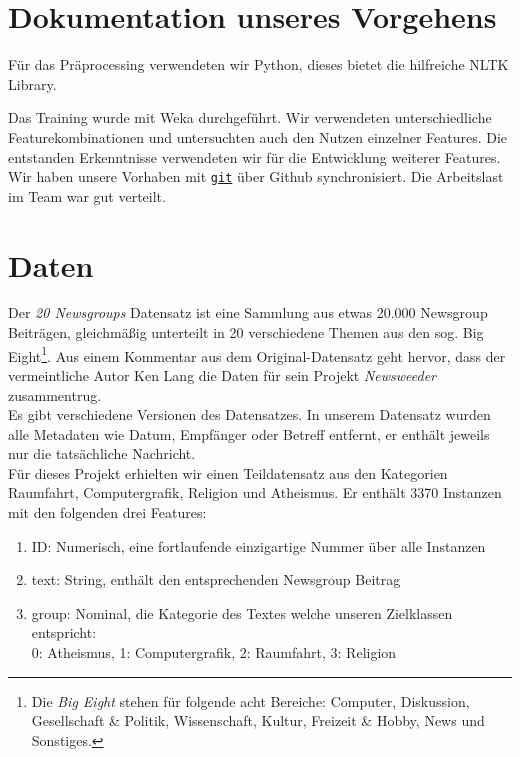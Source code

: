\documentclass[
	11pt,
	a4paper
]{scrartcl}
\newcommand{\code}[1]{\texttt{\ul{#1}}}
\begin{document}
\section{Dokumentation unseres Vorgehens}
Für das Präprocessing verwendeten wir Python, dieses bietet die hilfreiche NLTK Library.

Das Training wurde mit Weka durchgeführt. Wir verwendeten unterschiedliche Featurekombinationen und untersuchten auch den Nutzen einzelner Features. Die entstanden Erkenntnisse
verwendeten wir für die Entwicklung weiterer Features. Wir haben unsere Vorhaben mit \code{git} über Github synchronisiert. Die Arbeitslast im Team war gut verteilt.\\

\section{Daten}
Der \emph{20 Newsgroups} Datensatz ist eine Sammlung aus etwas 20.000 Newsgroup Beiträgen, gleichmäßig unterteilt in 20
verschiedene Themen aus den sog. Big Eight\footnote{Die \emph{Big Eight} stehen für folgende acht Bereiche: Computer,
Diskussion, Gesellschaft \& Politik, Wissenschaft, Kultur, Freizeit \& Hobby, News und Sonstiges.}. Aus einem Kommentar
aus dem Original-Datensatz geht hervor, dass der vermeintliche Autor Ken Lang die Daten für sein Projekt \emph{Newsweeder}
zusammentrug.\\
Es gibt verschiedene Versionen des Datensatzes. In unserem Datensatz wurden alle Metadaten wie Datum, Empfänger oder Betreff
entfernt, er enthält jeweils nur die tatsächliche Nachricht.\\

Für dieses Projekt erhielten wir einen Teildatensatz aus den Kategorien Raumfahrt,
Computergrafik, Religion und Atheismus. Er enthält 3370 Instanzen mit den folgenden drei Features:
\begin{enumerate}[label=\roman*), itemsep=0pt,parsep=0pt, topsep=0pt]
	\item ID: Numerisch, eine fortlaufende einzigartige Nummer über alle Instanzen
	\item text: String, enthält den entsprechenden Newsgroup Beitrag
	\item group: Nominal, die Kategorie des Textes welche unseren Zielklassen entspricht:\\
		0: Atheismus, 1: Computergrafik, 2: Raumfahrt, 3: Religion
\end{enumerate}
\end{document}
